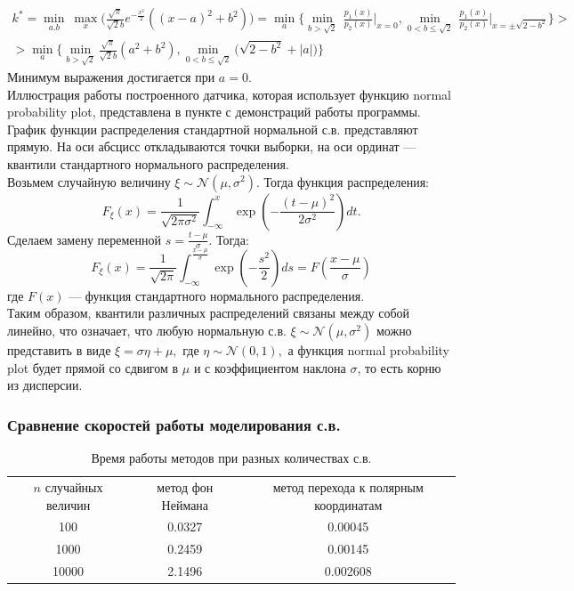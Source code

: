 \documentclass[11pt]{article}
\begin{document}
\begin{eqnarray*}
k^* = \underset{a.b}{\min} \ \underset{x}{\max}\bigg(\frac{\sqrt{\pi}}{\sqrt{2}b}e^{-\frac{x^2}{2}}((x - a)^2 + b^2)\bigg) = \underset{a}{\min} \bigg\{ \underset{b > \sqrt{2}}{\min} \  \frac{p_1(x)}{p_2(x)}\bigg|_{x = 0}, \underset{0 < b \leq \sqrt{2}}{\min} \ \frac{p_1(x)}{p_2(x)}\bigg|_{x = \pm \sqrt{2 - b^2}} \bigg\} > \\ 
>  \underset{a}{\min} \bigg\{ \underset{b > \sqrt{2}}{\min}   \frac{\sqrt{\pi}}{\sqrt{2}b}(a^2 + b^2), \underset{0 < b \leq \sqrt{2}}{\min}\big( \sqrt{2 - b^2} + |a| \big) \bigg\}
\end{eqnarray*}
Минимум выражения достигается при $a = 0.$\\
Иллюстрация работы построенного датчика, которая использует функцию normal probability plot, представлена в пункте с демонстраций работы программы. График функции распределения стандартной нормальной с.в. представляют прямую. На оси абсцисс откладываются точки выборки, на оси ординат --- квантили стандартного нормального распределения.\\
Возьмем случайную величину $\xi \sim \mathcal{N}(\mu,\sigma^2).$ Тогда функция распределения:
\[F_\xi(x) = \frac{1}{\sqrt{2\pi\sigma^2}}\int_{-\infty}^{x}\exp(-\frac{(t - \mu)^2}{2\sigma^2})dt .\]
Сделаем замену переменной $s = \frac{t - \mu}{\sigma}.$ Тогда:
\[ F_\xi(x) = \frac{1}{\sqrt{2\pi}}\int_{-\infty}^{\frac{x - \mu}{\sigma}}\exp(-\frac{s^2}{2})ds = F(\frac{x - \mu}{\sigma}) \]
где $F(x)$ --- функция стандартного нормального распределения.\\
Таким образом, квантили различных распределений связаны между собой линейно, что означает, что любую нормальную с.в. $\xi \sim \mathcal{N}(\mu, \sigma^2)$ можно представить в виде $\xi = \sigma\eta + \mu,$ где $\eta \sim \mathcal{N}(0,1),$ а функция normal probability plot будет прямой со сдвигом в $\mu$ и с коэффициентом наклона $\sigma$, то есть корню из дисперсии.
\subsubsection{Сравнение скоростей работы моделирования с.в.}
\begin{table}[h]
	\begin{center}
		\begin{tabular}{|c|c|c|}
			\hline
			$n$ случайных величин & метод фон Неймана & метод перехода к полярным координатам  \\
			100 & 0.0327 & 0.00045 \\
			1000 & 0.2459 & 0.00145 \\
			10000 & 2.1496  & 0.002608 \\
			\hline
		\end{tabular}
		
	\end{center}
	\caption{Время работы методов при разных количествах с.в.}
\end{table}
\end{document}
